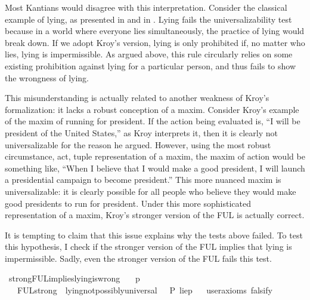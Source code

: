 \begin{isabellebody}
\begin{isamarkuptext}
Most Kantians would disagree with this interpretation. Consider the classical example of lying, as presented 
in \cite{kemp} and in \cite{KorsgaardFUL}. Lying fails the universalizability test because in a 
world where everyone lies simultaneously, the practice of lying would break down. If we adopt Kroy's 
version, lying is only prohibited if, no matter who lies, lying is impermissible. As argued above, this 
rule circularly relies on some existing prohibition against lying for a particular person, and thus 
fails to show the wrongness of lying. 

This misunderstanding is actually related to another weakness of Kroy's formalization: it lacks
a robust conception of a maxim. Consider Kroy's example of the maxim of running for president. If the 
action being evaluated is, ``I will be president of the United States,'' as Kroy interprets it, then 
it is clearly not universalizable for the reason he argued. However, using the most robust circumstance,
act, tuple representation of a maxim, the maxim of action would be something like, ``When I believe 
that I would make a good president, I will launch a presidential campaign to become president.'' This 
more nuanced maxim is universalizable: it is clearly possible for all people who believe they would
make good presidents to run for president. Under this more sophisticated representation of a maxim, 
Kroy's stronger version of the FUL is actually correct.

It is tempting to claim that this issue explains why the tests above failed. To test this hypothesis, 
I check if the stronger version of the FUL implies that lying is impermissible. Sadly, even the stronger
version of the FUL fails this test.%
\end{isamarkuptext}\isamarkuptrue%
\isamarkupfalse%
\ strongFUL{\isacharunderscore}implies{\isacharunderscore}lying{\isacharunderscore}is{\isacharunderscore}wrong{\isacharcolon}\isanewline
\ \ \ p\isanewline
\ \ \ {\isachardoublequoteopen}FUL{\isacharunderscore}strong\ {\isasymand}\ lying{\isacharunderscore}not{\isacharunderscore}possibly{\isacharunderscore}universal\ {\isasymlongrightarrow}\ {\isasymTurnstile}{\isacharparenleft}\isactrlbold {\isasymnot}\ P\ {\isacharbraceleft}lie{\isacharparenleft}p{\isacharparenright}{\isacharbraceright}{\isacharparenright}{\isachardoublequoteclose}\isanewline
\ \ \isamarkupfalse%
{\isacharbrackleft}user{\isacharunderscore}axioms{\isacharcomma}\ falsify{\isacharbrackright}%
\isadelimproof
\ %
\endisadelimproof
%
\isatagproof
{}\isamarkupfalse%
\isanewline
%
\end{isabellebody}
